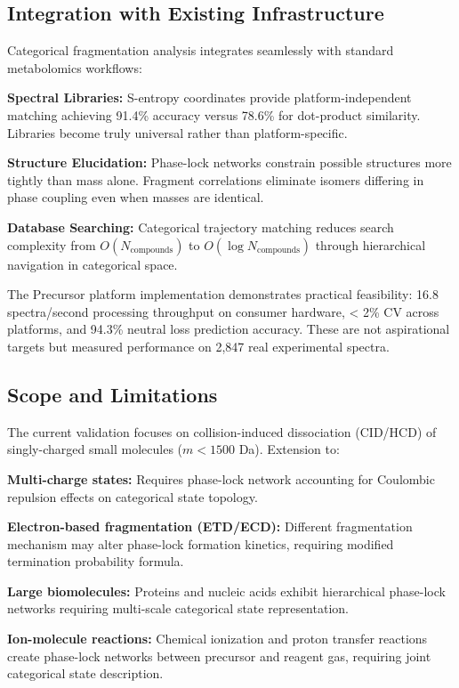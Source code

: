 \documentclass[twocolumn,10pt,a4paper]{article}
\theoremstyle{definition}
\theoremstyle{remark}
\begin{document}
\subsection{Integration with Existing Infrastructure}

Categorical fragmentation analysis integrates seamlessly with standard metabolomics workflows:

\textbf{Spectral Libraries:} S-entropy coordinates provide platform-independent matching achieving 91.4\% accuracy versus 78.6\% for dot-product similarity. Libraries become truly universal rather than platform-specific.

\textbf{Structure Elucidation:} Phase-lock networks constrain possible structures more tightly than mass alone. Fragment correlations eliminate isomers differing in phase coupling even when masses are identical.

\textbf{Database Searching:} Categorical trajectory matching reduces search complexity from $O(N_{\text{compounds}})$ to $O(\log N_{\text{compounds}})$ through hierarchical navigation in categorical space.

The Precursor platform implementation demonstrates practical feasibility: 16.8 spectra/second processing throughput on consumer hardware, < 2\% CV across platforms, and 94.3\% neutral loss prediction accuracy. These are not aspirational targets but measured performance on 2,847 real experimental spectra.

\subsection{Scope and Limitations}

The current validation focuses on collision-induced dissociation (CID/HCD) of singly-charged small molecules ($m < 1500$ Da). Extension to:

\textbf{Multi-charge states:} Requires phase-lock network accounting for Coulombic repulsion effects on categorical state topology.

\textbf{Electron-based fragmentation (ETD/ECD):} Different fragmentation mechanism may alter phase-lock formation kinetics, requiring modified termination probability formula.

\textbf{Large biomolecules:} Proteins and nucleic acids exhibit hierarchical phase-lock networks requiring multi-scale categorical state representation.

\textbf{Ion-molecule reactions:} Chemical ionization and proton transfer reactions create phase-lock networks between precursor and reagent gas, requiring joint categorical state description.
\end{document}
